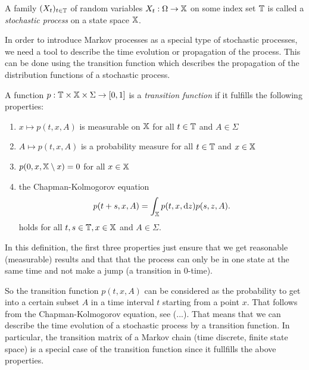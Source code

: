 \begin{defi}
A family $(X_t)_{t\in\mathbb{T}}$ of random variables $X_t : \Omega \rightarrow \mathbb{X}$ on some index set $\mathbb{T}$ is called
a \textit{stochastic process} on a state space $\mathbb{X}$. 
\end{defi}

In order to introduce Markov processes as a special type of stochastic processes, we need a
tool to describe the time evolution or propagation of the process. This can be done using the transition function which describes the propagation of the distribution functions of a stochastic process.

\begin{defi}
A function $p: \mathbb{T} \times \mathbb{X} \times \Sigma \rightarrow [0,1]$ is a \textit{transition function} if it fulfills the following properties: 
\begin{enumerate}
\item $x \mapsto p(t,x,A)$ is measurable on $\mathbb{X}$ for all $t\in\mathbb{T}$ and $A\in\Sigma$
\item $A \mapsto p(t,x,A)$ is a probability measure for all $t\in\mathbb{T}$ and $x\in\mathbb{X}$
\item $p(0,x,\mathbb{X} \setminus x) = 0$ for all $x \in\mathbb{X}$
\item the Chapman-Kolmogorov equation
\begin{equation*}
p(t+s,x,A) = \int_{\mathbb{X}} p(t,x,\mathop{}\!\mathrm{d} z)p(s,z,A).
\end{equation*}
holds for all $t,s\in\mathbb{T}, x\in\mathbb{X}$ and $A\in\Sigma$.
\end{enumerate}
\end{defi}
In this definition, the first three properties just ensure that we get reasonable (measurable) results and that that the process can only be in one state at the same time and not make a jump (a transition in $0$-time).

So the transition function $p(t,x,A)$ can be considered as the probability  to get into a certain subset $A$ in a time interval $t$ starting from a point $x$.
That follows from the Chapman-Kolmogorov equation, see (...). 
That means that we can describe the time evolution of a stochastic process by a transition function.
In particular, the transition matrix of a Markov chain (time discrete, finite state space) is a special case of the transition function since it fullfills the above properties.

